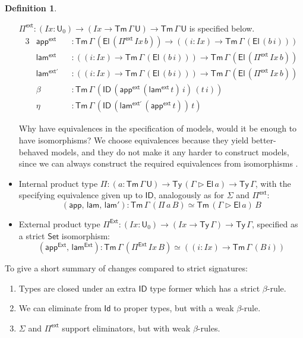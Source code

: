 \documentclass[12pt,a4paper,twoside,openany]{book}
\theoremstyle{remark}
\theoremstyle{definition}
\newtheorem{mydefinition}{Definition}
\theoremstyle{theorem}
\newcommand{\mi}[1]{\mathit{#1}}
\newcommand{\ms}[1]{\mathsf{#1}}
\newcommand{\Tm}{\mathsf{Tm}}
\newcommand{\Ty}{\mathsf{Ty}}
\newcommand{\U}{\mathsf{U}}
\newcommand{\El}{\mathsf{El}}
\newcommand{\Id}{\mathsf{Id}}
\newcommand{\ID}{\mathsf{ID}}
\newcommand{\Set}{\mathsf{Set}}
\newcommand{\ext}{\triangleright}
\newcommand{\Pie}{\Pi^{\mathsf{Ext}}}
\newcommand{\appe}{\mathsf{app^{Ext}}}
\newcommand{\lame}{\mathsf{lam^{Ext}}}
\newcommand{\Piinf}{\Pi^{\mathsf{ext}}}
\newcommand{\appinf}{\mathsf{app^{ext}}}
\newcommand{\laminf}{\mathsf{lam^{ext}}}
\newcommand{\laminfprime}{\mathsf{lam^{ext'}}}
\newcommand{\app}{\ms{app}}
\newcommand{\lam}{\ms{lam}}
\begin{document}
\begin{mydefinition}
\begin{itemize}
  $\Piinf : (\mi{Ix} : \U_0) \to (\mi{Ix} \to \Tm\,\Gamma\,\U) \to
  \Tm\,\Gamma\,\U$ is specified below.
  \begingroup
  \allowdisplaybreaks
  \begin{alignat*}{3}
    &\appinf &&: \Tm\,\Gamma\,(\El\,(\Piinf\,\mi{Ix}\,b)) \to ((i : \mi{Ix}) \to \Tm\,\Gamma\,(\El\,(b\,i)))\\
    &\laminf &&: ((i : \mi{Ix}) \to \Tm\,\Gamma\,(\El\,(b\,i))) \to \Tm\,\Gamma\,(\El\,(\Piinf\,\mi{Ix}\,b))\\
    &\laminfprime &&: ((i : \mi{Ix}) \to \Tm\,\Gamma\,(\El\,(b\,i))) \to \Tm\,\Gamma\,(\El\,(\Piinf\,\mi{Ix}\,b))\\
    &\ms{\beta} &&: \Tm\,\Gamma\,(\ID\,(\appinf\,(\laminf\,t)\,i)\,(t\,i))\\
    &\ms{\eta}  &&: \Tm\,\Gamma\,(\ID\,(\laminfprime\,(\appinf\,t))\,t)
  \end{alignat*}
  \endgroup

  Why have equivalences in the specification of models, would it be enough to
  have isomorphisms? We choose equivalences because they yield better-behaved
  models, and they do not make it any harder to construct models, since we can
  always construct the required equivalences from isomorphisms
  \cite[Chapter~4]{hottbook}.

  \item
  Internal product type $\Pi : (a : \Tm\,\Gamma\,\U) \to \Ty\,(\Gamma\ext
  \El\,a) \to \Ty\,\Gamma$, with the specifying equivalence given up to $\ID$,
  analogously as for $\Sigma$ and $\Piinf$:
  \[
    (\app,\,\lam,\,\lam') : \Tm\,\Gamma\,(\Pi\,a\,B) \simeq \Tm\,(\Gamma\ext \El\,a)\,B
  \]

  \item External product type $\Pie : (\mi{Ix} : \U_0) \to (\mi{Ix} \to
  \Ty\,\Gamma) \to \Ty\,\Gamma$, specified as a strict $\Set$ isomorphism:
  \[(\appe,\,\lame) : \Tm\,\Gamma\,(\Pie\,\mi{Ix}\,B) \simeq ((i : \mi{Ix}) \to \Tm\,\Gamma\,(B\,i))\]
\end{itemize}
\end{mydefinition}

\noindent To give a short summary of changes compared to strict signatures:
\begin{enumerate}
  \item Types are closed under an extra $\ID$ type former which has a strict $\beta$-rule.
  \item We can eliminate from $\Id$ to proper types, but with a weak $\beta$-rule.
  \item $\Sigma$ and $\Piinf$ support eliminators, but with weak $\beta$-rules.
\end{enumerate}
\end{document}
